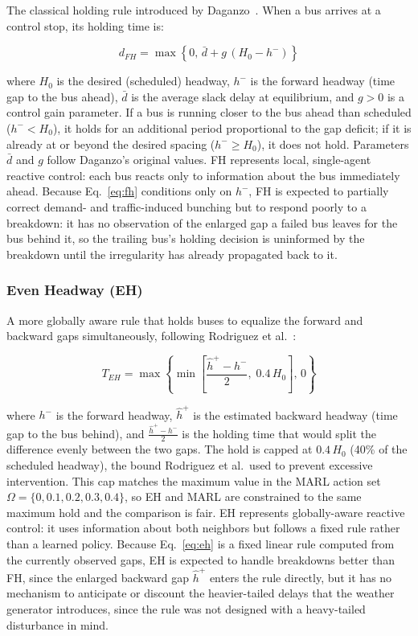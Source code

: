 The classical holding rule introduced by Daganzo~\cite{Daganzo2009}. When a bus arrives at a control stop, its holding time is:

\begin{equation}
d_{FH} = \max\!\left\{0,\, \bar{d} + g\,(H_0 - h^-)\right\}
\label{eq:fh}
\end{equation}

where $H_0$ is the desired (scheduled) headway, $h^-$ is the forward headway (time gap to the bus ahead), $\bar{d}$ is the average slack delay at equilibrium, and $g > 0$ is a control gain parameter. If a bus is running closer to the bus ahead than scheduled ($h^- < H_0$), it holds for an additional period proportional to the gap deficit; if it is already at or beyond the desired spacing ($h^- \geq H_0$), it does not hold. Parameters $\bar{d}$ and $g$ follow Daganzo's original values. FH represents local, single-agent reactive control: each bus reacts only to information about the bus immediately ahead. Because Eq.~\eqref{eq:fh} conditions only on $h^-$, FH is expected to partially correct demand- and traffic-induced bunching but to respond poorly to a breakdown: it has no observation of the enlarged gap a failed bus leaves for the bus behind it, so the trailing bus's holding decision is uninformed by the breakdown until the irregularity has already propagated back to it.

\subsubsection{Even Headway (EH)}

A more globally aware rule that holds buses to equalize the forward and backward gaps simultaneously, following Rodriguez et al.~\cite{Rodriguez2023Cooperative}:

\begin{equation}
T_{EH} = \max\!\left\{\min\!\left[\frac{\hat{h}^+ - h^-}{2},\; 0.4\,H_0\right],\, 0\right\}
\label{eq:eh}
\end{equation}

where $h^-$ is the forward headway, $\hat{h}^+$ is the estimated backward headway (time gap to the bus behind), and $\frac{\hat{h}^+ - h^-}{2}$ is the holding time that would split the difference evenly between the two gaps. The hold is capped at $0.4\,H_0$ (40\% of the scheduled headway), the bound Rodriguez et al.\ used to prevent excessive intervention. This cap matches the maximum value in the MARL action set $\Omega = \{0, 0.1, 0.2, 0.3, 0.4\}$, so EH and MARL are constrained to the same maximum hold and the comparison is fair. EH represents globally-aware reactive control: it uses information about both neighbors but follows a fixed rule rather than a learned policy. Because Eq.~\eqref{eq:eh} is a fixed linear rule computed from the currently observed gaps, EH is expected to handle breakdowns better than FH, since the enlarged backward gap $\hat{h}^+$ enters the rule directly, but it has no mechanism to anticipate or discount the heavier-tailed delays that the weather generator introduces, since the rule was not designed with a heavy-tailed disturbance in mind.
\clearpage
